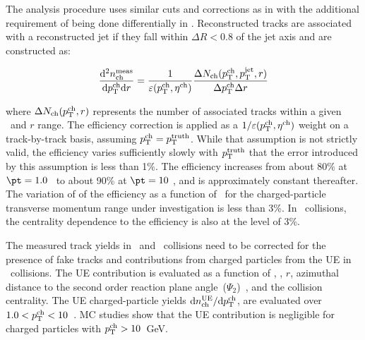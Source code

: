 
The analysis procedure uses similar cuts and corrections as in \cite{PhysRevC.98.024908} with the additional requirement of being done differentially in \rvar. Reconstructed tracks are associated with a reconstructed jet if they fall within $\Delta R < 0.8$ of the jet axis and are constructed as:

\begin{eqnarray}
\dfrac{\mathrm{d}^{2} \mbox{$n_{\mathrm{ch}}^{\mathrm{meas}}$} }{ \mathrm{d} \mbox{$p_{\mathrm{T}}^{\mathrm{ch}}$} \mathrm{d} r} = \frac{1}{\varepsilon(\mbox{$p_{\mathrm{T}}^{\mathrm{ch}}$},\mbox{$\eta^{\mathrm{ch}}$})} \frac{\Delta \mbox{$N_{\mathrm{ch}}$}(\mbox{$p_{\mathrm{T}}^{\mathrm{ch}}$},\mbox{$p_{\mathrm{T}}^{\mathrm{jet}}$},r)}{\Delta\mbox{$p_{\mathrm{T}}^{\mathrm{ch}}$} \Delta r}
\end{eqnarray}

where $\Delta \mbox{$N_{\mathrm{ch}}$} (\mbox{$p_{\mathrm{T}}^{\mathrm{ch}}$},r)$ represents the number of associated tracks within a given \pttrk\ and $r$ range. The efficiency correction is applied as a $1/\varepsilon(\mbox{$p_{\mathrm{T}}^{\mathrm{ch}}$},\mbox{$\eta^{\mathrm{ch}}$})$ weight on a track-by-track basis, assuming $\mbox{$p_{\mathrm{T}}^{\mathrm{ch}}$} = \mbox{$p_{\mathrm{T}}^{\mathrm{truth}}$}$. While that assumption is not strictly valid, the efficiency varies sufficiently slowly with $\mbox{$p_{\mathrm{T}}^{\mathrm{truth}}$}$ that the error
introduced by this assumption is less than 1\%. The efficiency increases from about 80\% at \mbox{$ \pt = 1.0$ \GeV} to about 90\% at $ \pt = 10 $ \GeV, and is approximately constant thereafter. The variation of of the efficiency as a function of \ptjet\ for the charged-particle transverse momentum range under investigation is less than 3\%. In \pbpb\ collisions, the centrality dependence to the efficiency is also at the level of 3\%.

The measured track yields in \pp\ and \PbPb\ collisions need to be corrected for the presence of fake tracks and contributions from charged particles from the UE in \pbpb\ collisions. The UE contribution is evaluated as a function of \pttrk, \ptjet, $r$, azimuthal distance to the second order reaction plane angle~($\Psi_{2}$)~\cite{ATLAS:2012at}, and the collision centrality. The UE charged-particle yields $\mathrm{d} \mbox{$n_{\mathrm{ch}}^{\mathrm{UE}}$}/ \mathrm{d} \mbox{$p_{\mathrm{T}}^{\mathrm{ch}}$}$, are evaluated over \mbox{$1.0 < \mbox{$p_{\mathrm{T}}^{\mathrm{ch}}$} < 10$~\GeV}. MC studies show that the UE contribution is negligible for charged particles with $\mbox{$p_{\mathrm{T}}^{\mathrm{ch}}$}>10$~GeV.

